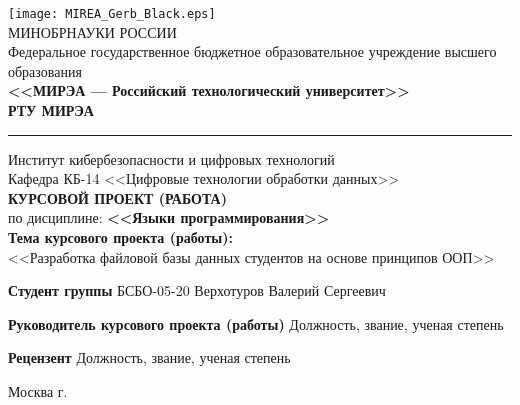 \documentclass[14pt, a4paper, titlepage]{extarticle}
\begin{document}
\begin{titlepage}
    \begin{center}
        \texttt{[image: MIREA\_Gerb\_Black.eps]} \\
        МИНОБРНАУКИ РОССИИ \\ 
        Федеральное государственное бюджетное образовательное учреждение высшего образования \\
        \textbf{<<МИРЭА --- Российский технологический университет>>} \\
        \textbf{РТУ МИРЭА}
        \rule{\textwidth}{1pt}
        Институт кибербезопасности и цифровых технологий \\
        Кафедра КБ-14 <<Цифровые технологии обработки данных>> \\ \bigskip
        \fontsize{16pt}{16pt}\selectfont
        \textbf{КУРСОВОЙ ПРОЕКТ (РАБОТА)} \\ \bigskip \bigskip
        по дисциплине: \textbf{<<Языки программирования>>} \\ \bigskip \bigskip
        \textbf{Тема курсового проекта (работы):} \\
        <<Разработка файловой базы данных студентов на основе принципов ООП>>
    \end{center}
    \noindent\textbf{Студент группы} {\fontsize{16pt}{16pt}\selectfont БСБО-05-20 Верхотуров Валерий Сергеевич}\par
    \noindent\textbf{Руководитель курсового проекта (работы)} {\fontsize{16pt}{16pt}\selectfont Должность, звание, ученая степень}\par
    \noindent\textbf{Рецензент} {\fontsize{16pt}{16pt}\selectfont Должность, звание, ученая степень}\par
    \centering\vfill 
    Москва \the\year{} г.
\end{titlepage}
\end{document}

